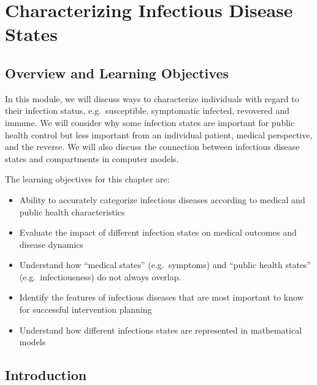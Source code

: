 \documentclass[]{book}
\providecommand{\tightlist}{%
  \setlength{\itemsep}{0pt}\setlength{\parskip}{0pt}}
\theoremstyle{definition}
\theoremstyle{definition}
\theoremstyle{definition}
\theoremstyle{remark}
\begin{document}
\hypertarget{idstates}{%
\chapter{Characterizing Infectious Disease States}\label{idstates}}

\hypertarget{overview-and-learning-objectives-1}{%
\section{Overview and Learning
Objectives}\label{overview-and-learning-objectives-1}}

In this module, we will discuss ways to characterize individuals with
regard to their infection status, e.g.~susceptible, symptomatic
infected, revovered and immune. We will consider why some infection
states are important for public health control but less important from
an individual patient, medical perspective, and the reverse. We will
also discuss the connection between infectious disease states and
compartments in computer models.

The learning objectives for this chapter are:

\begin{itemize}
\tightlist
\item
  Ability to accurately categorize infectious diseases according to
  medical and public health characteristics
\item
  Evaluate the impact of different infection states on medical outcomes
  and disease dynamics
\item
  Understand how ``medical states'' (e.g.~symptoms) and ``public health
  states'' (e.g.~infectiousness) do not always overlap.
\item
  Identify the features of infectious diseases that are most important
  to know for successful intervention planning
\item
  Understand how different infections states are represented in
  mathematical models
\end{itemize}

\hypertarget{introduction}{%
\section{Introduction}\label{introduction}}
\end{document}
